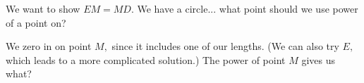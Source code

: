 We want to show $EM = MD.$  We have a circle... what point should we use power of a point on?





We zero in on point $M,$ since it includes one of our lengths. (We can also try $E,$ which leads to a more complicated solution.) The power of point $M$ gives us what?

















